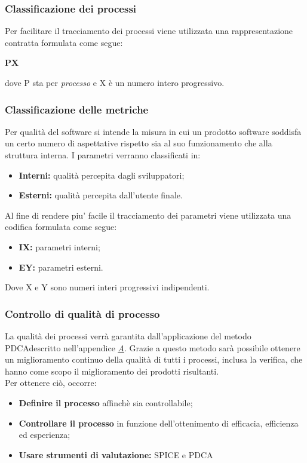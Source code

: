 \subsubsection{Classificazione dei processi}
	    Per facilitare il tracciamento dei processi viene utilizzata una rappresentazione contratta formulata come segue:
	    \begin{center}
	    	\textbf{PX}
	    \end{center}
	    dove P sta per \textit{processo} e X è un numero intero progressivo.
\subsubsection{Classificazione delle metriche}
Per qualità del software si intende la misura in cui un prodotto software soddisfa un certo numero di aspettative rispetto sia al suo funzionamento che alla struttura interna. I parametri verranno classificati in:
\begin{itemize}
    \item{\textbf{Interni:} qualità percepita dagli sviluppatori;}
    \item{\textbf{Esterni:} qualità percepita dall'utente finale.}
\end{itemize}
Al fine di rendere piu' facile il tracciamento dei parametri viene utilizzata una codifica formulata come segue:
\begin{itemize}
    \item{\textbf{IX:} parametri interni;}
    \item{\textbf{EY:} parametri esterni.}
\end{itemize}
Dove X e Y sono numeri interi progressivi indipendenti.
\subsubsection{Controllo di qualità di processo}
La qualità dei processi verrà garantita dall'applicazione del metodo PDCA\pedice descritto nell'appendice \hyperref[A]{\textit{\underline{A}}}. Grazie a questo metodo sarà possibile ottenere un miglioramento continuo della qualità di tutti i processi, inclusa la verifica, che hanno come scopo il miglioramento dei prodotti risultanti.\\
Per ottenere ciò, occorre:
\begin{itemize}
\item \textbf{Definire il processo} affinchè sia controllabile;
\item \textbf{Controllare il processo} in funzione dell'ottenimento di efficacia, efficienza ed esperienza;
\item \textbf{Usare strumenti di valutazione:} SPICE e PDCA
\end{itemize}
